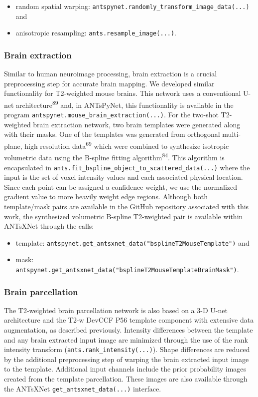 \documentclass[
  12pt,
]{article}
\begin{document}
\begin{itemize}
\item
  random spatial warping:
  \texttt{antspynet.randomly\_transform\_image\_data(...)} and
\item
  anisotropic resampling: \texttt{ants.resample\_image(...)}.
\end{itemize}

\subsubsection{Brain extraction}\label{brain-extraction}

Similar to human neuroimage processing, brain extraction is a crucial
preprocessing step for accurate brain mapping. We developed similar
functionality for T2-weighted mouse brains. This network uses a
conventional U-net architecture\textsuperscript{89} and, in ANTsPyNet,
this functionality is available in the program
\texttt{antspynet.mouse\_brain\_extraction(...)}. For the two-shot
T2-weighted brain extraction network, two brain templates were generated
along with their masks. One of the templates was generated from
orthogonal multi-plane, high resolution data\textsuperscript{69} which
were combined to synthesize isotropic volumetric data using the B-spline
fitting algorithm\textsuperscript{84}. This algorithm is encapsulated in
\texttt{ants.fit\_bspline\_object\_to\_scattered\_data(...)} where the
input is the set of voxel intensity values and each associated physical
location. Since each point can be assigned a confidence weight, we use
the normalized gradient value to more heavily weight edge regions.
Although both template/mask pairs are available in the GitHub repository
associated with this work, the synthesized volumetric B-spline
T2-weighted pair is available within ANTsXNet through the calls:

\begin{itemize}
\item
  template:
  \texttt{antspynet.get\_antsxnet\_data("bsplineT2MouseTemplate")} and
\item
  mask:
  \texttt{antspynet.get\_antsxnet\_data("bsplineT2MouseTemplateBrainMask")}.
\end{itemize}

\subsubsection{Brain parcellation}\label{brain-parcellation}

The T2-weighted brain parcellation network is also based on a 3-D U-net
architecture and the T2-w DevCCF P56 template component with extensive
data augmentation, as described previously. Intensity differences
between the template and any brain extracted input image are minimized
through the use of the rank intensity transform
(\texttt{ants.rank\_intensity(...)}). Shape differences are reduced by
the additional preprocessing step of warping the brain extracted input
image to the template. Additional input channels include the prior
probability images created from the template parcellation. These images
are also available through the ANTsXNet
\texttt{get\_antsxnet\_data(...)} interface.
\end{document}
